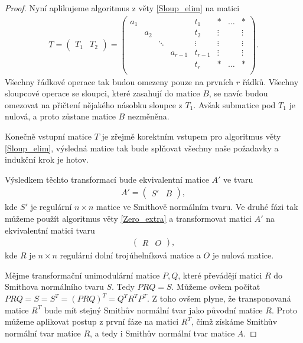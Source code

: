 \begin{proof}
Nyní aplikujeme algoritmus z věty \ref{Sloup_elim} na matici
\begin{align*}
T =
    \left(
    \begin{array}{c|c}
        T_1 & T_2
    \end{array}
    \right)
  =
    \left(
    \begin{array}{ccccc|ccc}
        a_1 &     &        &         & t_1     & \ast   & \hdots & \ast   \\
            & a_2 &        &         & t_2     & \vdots &        & \vdots \\
            &     & \ddots &         & \vdots  & \vdots &        & \vdots \\
            &     &        & a_{r-1} & t_{r-1} & \vdots &        & \vdots \\
            &     &        &         & t_r     & \ast   & \hdots & \ast   \\
    \end{array}
    \right)
.
\end{align*}
Všechny řádkové operace tak budou omezeny pouze na prvních $ r $ řádků. Všechny
sloupcové operace se sloupci, které zasahují do matice $ B $,
se navíc budou omezovat na přičtení nějakého násobku sloupce z $ T_1 $. Avšak
submatice pod $ T_1 $ je nulová, a proto zůstane matice $ B $ nezměněna.

Konečně vstupní matice $ T $ je zřejmě korektním vstupem pro algoritmus
věty \ref{Sloup_elim}, výsledná matice tak bude splňovat všechny naše požadavky
a indukční krok je hotov.

Výsledkem těchto transformací bude ekvivalentní matice $ A' $ ve tvaru
\begin{align*}
A' =
    \left(
    \begin{array}{c|c}
        S' & B
    \end{array}
    \right)
,
\end{align*}
kde $ S' $ je regulární $ n \times n $ matice ve Smithově normálním tvaru.
Ve druhé fázi tak můžeme použít algoritmus věty \ref{Zero_extra} a transformovat
matici $ A' $ na ekvivalentní matici tvaru
\begin{align*}
    \left(
    \begin{array}{c|c}
        R & O
    \end{array}
    \right)
,
\end{align*}
kde $ R $ je $ n \times n $ regulární dolní trojúhelníková matice a $ O $ je
nulová matice.

Mějme transformační unimodulární matice $ P, Q $, které převádějí matici $ R $
do Smithova normálního tvaru $ S $. Tedy $ P R Q = S $. Můžeme ovšem počítat
$ P R Q = S = S^T = (P R Q)^T = Q^T R^T P^T $. Z toho ovšem plyne, že
transponovaná matice $ R^T $ bude mít stejný Smithův normální tvar jako původní
matice $ R $. Proto můžeme aplikovat postup z první fáze na matici $ R^T $,
čímž získáme Smithův normální tvar matice $ R $, a tedy i Smithův normální tvar
matice $ A $.
\end{proof}


